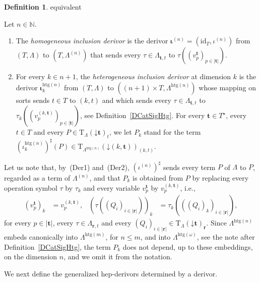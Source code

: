 \documentclass[a4paper, reqno]{amsbook}
\makeatletter
\newcommand{\bb}[1]{\ensuremath{\lvert #1 \rvert}}
\newcommand{\vs}[1]{\mathbin{\downarrow}#1}
\newcommand{\htg}{\mathrm{htg}}                %
\newcommand{\id}{\mathrm{id}}
\theoremstyle{plain}
\theoremstyle{definition}
\newtheorem{definition}[theorem]{Definition}
\newcommand*{\CA@leanpending}{}
\newcommand*{\CA@leanrelation}{}
\newcommand*{\lean}[2]{%
  \ifcsname\string\color@lean@#1\endcsname\else
    \PackageError{main}{Unknown relation `#1' in \string\lean}{Use equivalent, weaker or stronger.}%
  \fi
  \gdef\CA@leanrelation{#1}%
  \gdef\CA@leanpending{#2}}
\makeatother
\begin{document}
\begin{definition}\label{DInclusionDerivors}\lean{equivalent}{ChangeOfSignature.homogeneousInclusion,ChangeOfSignature.heterogeneousInclusion}
Let $n\in\mathbb{N}$.
\begin{enumerate}
\item The \emph{homogeneous inclusion derivor} is the derivor $\boldsymbol{\iota}^{(n)}=(\id_{T},\iota^{(n)})$ from $(T,\Lambda)$ to $(T,\Lambda^{(n)})$ that sends every $\tau\in\Lambda_{\mathbf{t},t}$ to $\tau((v^{\mathbf{t}}_{p})_{p\in\bb{\mathbf{t}}})$.
\item For every $k\in n+1$, the \emph{heterogeneous inclusion derivor} at dimension $k$ is the derivor $\boldsymbol{\iota}^{\htg(n)}_{k}$ from $(T,\Lambda)$ to $((n+1)\times T,\Lambda^{\htg(n)})$ whose mapping on sorts sends $t\in T$ to $(k,t)$ and which sends every $\tau\in\Lambda_{\mathbf{t},t}$ to $\tau_{k}((v^{(k,\mathbf{t})}_{p})_{p\in\bb{\mathbf{t}}})$, see Definition~\ref{DCatSigHtg}.
For every $\mathbf{t}\in T^{\star}$, every $t\in T$ and every $P\in\mathrm{T}_{\Lambda}(\vs{\mathbf{t}})_{t}$, we let $P_{k}$ stand for the term $(\iota^{\htg(n)}_{k})^{\sharp}(P)\in\mathrm{T}_{\Lambda^{\htg(n)}}(\vs{(k,\mathbf{t})})_{(k,t)}$.
\end{enumerate}
\end{definition}

Let us note that, by~(Der1) and~(Der2), $(\iota^{(n)})^{\sharp}$ sends every term $P$ of $\Lambda$ to $P$, regarded as a term of $\Lambda^{(n)}$, and that $P_{k}$ is obtained from $P$ by replacing every operation symbol $\tau$ by $\tau_{k}$ and every variable $v^{\mathbf{t}}_{p}$ by $v^{(k,\mathbf{t})}_{p}$, i.e.,
\begin{align*}
\left(v^{\mathbf{t}}_{p}\right)_{k}&=v^{(k,\mathbf{t})}_{p},
&
\left(\tau\left((Q_{i})_{i\in\bb{\mathbf{r}}}\right)\right)_{k}&=\tau_{k}\left(\left((Q_{i})_{k}\right)_{i\in\bb{\mathbf{r}}}\right),
\end{align*}
for every $p\in\bb{\mathbf{t}}$, every $\tau\in\Lambda_{\mathbf{r},t}$ and every $(Q_{i})_{i\in\bb{\mathbf{r}}}\in\mathrm{T}_{\Lambda}(\vs{\mathbf{t}})_{\mathbf{r}}$.
Since $\Lambda^{\htg(n)}$ embeds canonically into $\Lambda^{\htg(m)}$, for $n\leq m$, and into $\Lambda^{\htg(\omega)}$, see the note after Definition~\ref{DCatSigHtg}, the term $P_{k}$ does not depend, up to these embeddings, on the dimension $n$, and we omit it from the notation.

We next define the generalized hep-derivors determined by a derivor.
\end{document}
